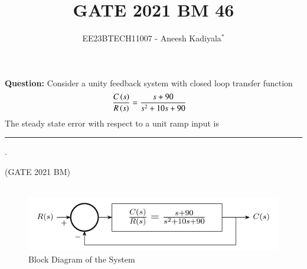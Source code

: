 \documentclass[journal,12pt,twocolumn]{IEEEtran}
\theoremstyle{remark}
\begin{document}

\vspace{3cm}

\title{GATE 2021 BM 46}
\author{EE23BTECH11007 - Aneesh Kadiyala$^{*}$%
}
\maketitle
\newpage
\bigskip

\renewcommand{\thefigure}{\theenumi}
\renewcommand{\thetable}{\theenumi}

\vspace{3cm}
\textbf{Question:} Consider a unity feedback system with closed loop transfer function
\begin{align*}
\frac{C\left(s\right)}{R\left(s\right)} &= \frac{s + 90}{s^2 + 10s + 90}
\end{align*}
The steady state error with respect to a unit ramp input is \rule{1cm}{0.15mm} . 

\hfill(GATE 2021 BM)
\\
\solution
\\
\fi
\begin{figure}[h!]
\centering
\includegraphics[width=\columnwidth]{2021/BM/46/figs/block-diagram.pdf}
\caption{Block Diagram of the System}
\label{fig:2021bm46-1}
\end{figure}
\end{document}
